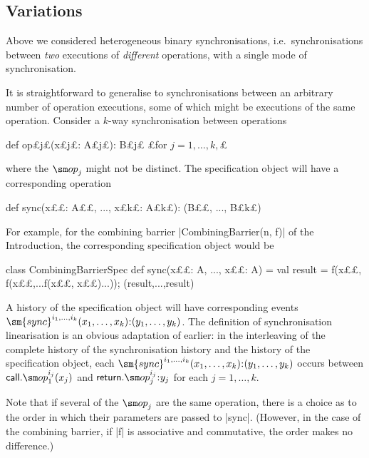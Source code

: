 \subsection{Variations}
\label{ssec:spec-variations}

Above we considered heterogeneous binary synchronisations,
i.e.~synchronisations between \emph{two} executions of \emph{different}
operations, with a single mode of synchronisation.

It is straightforward to generalise to synchronisations between an arbitrary
number of operation executions, some of which might be executions of the same
operation.  Consider a $k$-way synchronisation between operations
\begin{scala}
def op£\s j£(x£\s j£: A£\s j£): B£\s j£   £for $j = 1, \ldots, k,$£
\end{scala}
%
where the $\op_j$ might not be distinct.
The specification object will have a corresponding operation
%
\begin{scala} 
def sync(x££: A££, ..., x£\s k£: A£\s k£): (B££, ..., B£\s k£)
\end{scala}
%
For example, for the combining barrier |CombiningBarrier(n, f)| of the
Introduction, the corresponding specification object would be
\begin{scala}
class CombiningBarrierSpec{
  def sync(x££: A, ..., x££: A) = {
    val result = f(x££, f(x££,...f(x££, x££)...)); (result,...,result)
  }
}
\end{scala}

A history of the specification object will have corresponding events
$\sm{sync}^{i_1, \ldots, i_k}(x_1, \ldots, x_k)\:: (y_1, \ldots, y_k)$.
%
The definition of synchronisation linearisation is an obvious adaptation of
earlier: in the interleaving of the complete history of the synchronisation
history and the history of the specification object, each $\sm{sync}^{i_1,
  \ldots, i_k}(x_1, \ldots, x_k)\:: (y_1, \ldots, y_k)$ occurs between
$\call.\op_1^{i_j}(x_j)$ and $\return.\op_j^{i_j}\::y_j$ for each $j = 1,
\ldots, k$.  

Note that if several of the $\op_j$ are the same operation, there is a choice
as to the order in which their parameters are passed to |sync|.  (However, in
the case of the combining barrier, if |f| is associative and commutative, the
order makes no difference.)

